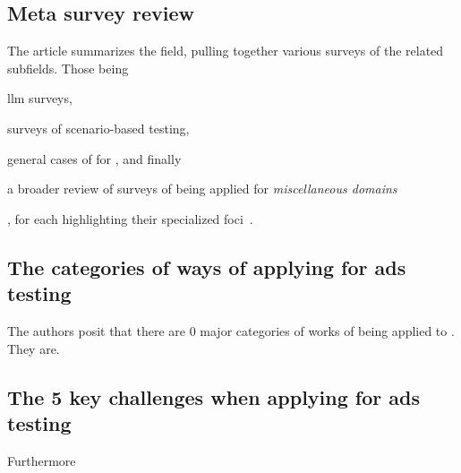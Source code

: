 \subsection{Meta survey review}

The article summarizes the field, pulling together various surveys of the
related subfields. Those being \begin{inparaenum}
    \item \acrshort{llm} surveys,
    \item surveys of scenario-based testing,
    \item general cases of  for , and finally
    \item a broader review of surveys of  being applied for
    \textit{miscellaneous domains}
    \end{inparaenum},
for each highlighting their specialized
foci~\cite[2]{surveyLLMScenarioBasedTesting}.

\subsection{The categories of ways of applying  for \acrshort{ads} testing}

The authors posit that there are \num{0} major categories of works of
 being applied to . They are.

\subsection{The \num{5} key challenges when applying  for
\acrshort{ads} testing}

Furthermore
